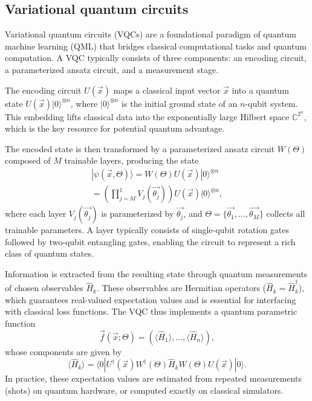 \documentclass[conference]{IEEEtran}
\begin{document}
\subsection{Variational quantum circuits}
Variational quantum circuits (VQCs) are a foundational paradigm of quantum machine learning (QML) that bridges classical computational tasks and quantum computation. A VQC typically consists of three components: an encoding circuit, a parameterized ansatz circuit, and a measurement stage.

The encoding circuit $U(\overrightarrow{x})$ maps a classical input vector $\overrightarrow{x}$ into a quantum state $U(\overrightarrow{x})|0\rangle^{\otimes n}$, where $|0\rangle^{\otimes n}$ is the initial ground state of an $n$-qubit system. This embedding lifts classical data into the exponentially large Hilbert space $\mathbb{C}^{2^n}$, which is the key resource for potential quantum advantage.

The encoded state is then transformed by a parameterized ansatz circuit $W(\Theta)$ composed of $M$ trainable layers, producing the state
\begin{align}
    |\psi(\overrightarrow{x}, \Theta)\rangle = W(\Theta)U(\overrightarrow{x})|0\rangle^{\otimes n} \nonumber \\ = \left(\prod_{j=M}^{1} V_j(\overrightarrow{\theta_j})\right)U(\overrightarrow{x})|0\rangle^{\otimes n},
\label{QuantumState}
\end{align}
where each layer $V_j(\overrightarrow{\theta_j})$ is parameterized by $\overrightarrow{\theta_j}$, and $\Theta=\{\overrightarrow{\theta_1}, \ldots, \overrightarrow{\theta_M}\}$ collects all trainable parameters. A layer typically consists of single-qubit rotation gates followed by two-qubit entangling gates, enabling the circuit to represent a rich class of quantum states.

Information is extracted from the resulting state through quantum measurements of chosen observables $\hat{H}_k$. These observables are Hermitian operators ($\hat{H}_k=\hat{H}_k^\dagger$), which guarantees real-valued expectation values and is essential for interfacing with classical loss functions. The VQC thus implements a quantum parametric function
\begin{equation}
\overrightarrow{f}(\overrightarrow{x}; \Theta) = \left(\langle \hat{H}_1 \rangle, \ldots, \langle \hat{H}_n \rangle\right),
\end{equation}
whose components are given by
\begin{equation}
\langle \hat{H}_k \rangle = \langle 0|U^{\dagger}(\overrightarrow{x})W^{\dagger}(\Theta)\hat{H}_k W(\Theta)U(\overrightarrow{x})|0\rangle.
\end{equation}
In practice, these expectation values are estimated from repeated measurements (shots) on quantum hardware, or computed exactly on classical simulators.
\end{document}
